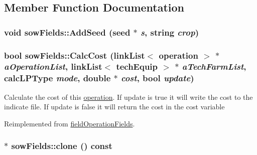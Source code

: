 \subsection{Member Function Documentation}
\hypertarget{classsow_fields_afd7b68580aa74038af38793d3578918e}{
\subsubsection[{AddSeed}]{\setlength{\rightskip}{0pt plus 5cm}void sowFields::AddSeed ({\bf seed} $\ast$ {\em s}, \/  string {\em crop})}}
\label{classsow_fields_afd7b68580aa74038af38793d3578918e}
\hypertarget{classsow_fields_a7834909587530be2801797f19d3fa242}{
\subsubsection[{CalcCost}]{\setlength{\rightskip}{0pt plus 5cm}bool sowFields::CalcCost ({\bf linkList}$<$ {\bf operation} $>$ $\ast$ {\em aOperationList}, \/  {\bf linkList}$<$ {\bf techEquip} $>$ $\ast$ {\em aTechFarmList}, \/  {\bf calcLPType} {\em mode}, \/  double $\ast$ {\em cost}, \/  bool {\em update})}}
\label{classsow_fields_a7834909587530be2801797f19d3fa242}
Calculate the cost of this \hyperlink{classoperation}{operation}. If update is true it will write the cost to the indicate file. If update is false it will return the cost in the cost variable 

Reimplemented from \hyperlink{classfield_operation_fields_aeb2bce9d4612033dbab366d870e432a6}{fieldOperationFields}.\hypertarget{classsow_fields_a0feeb92725f01a4e58784ca0d7a7d98e}{
\subsubsection[{clone}]{ $\ast$ sowFields::clone () const}}
\label{classsow_fields_a0feeb92725f01a4e58784ca0d7a7d98e}



